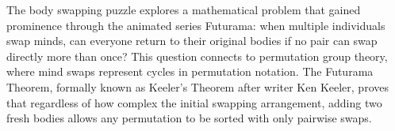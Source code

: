 The body swapping puzzle explores a mathematical problem that gained prominence through the animated series Futurama: when multiple individuals swap minds, can everyone return to their original bodies if no pair can swap directly more than once? This question connects to permutation group theory, where mind swaps represent cycles in permutation notation. The Futurama Theorem, formally known as Keeler's Theorem after writer Ken Keeler, proves that regardless of how complex the initial swapping arrangement, adding two fresh bodies allows any permutation to be sorted with only pairwise swaps.
